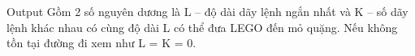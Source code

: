 Output
\textbf{}   Gồm 2 số nguyên dương là L – độ dài dãy lệnh ngắn nhất và K – số dãy lệnh khác nhau có cùng độ dài L có thể đưa LEGO đến mỏ quặng. Nếu không tồn tại đường đi xem như L = K = 0.
